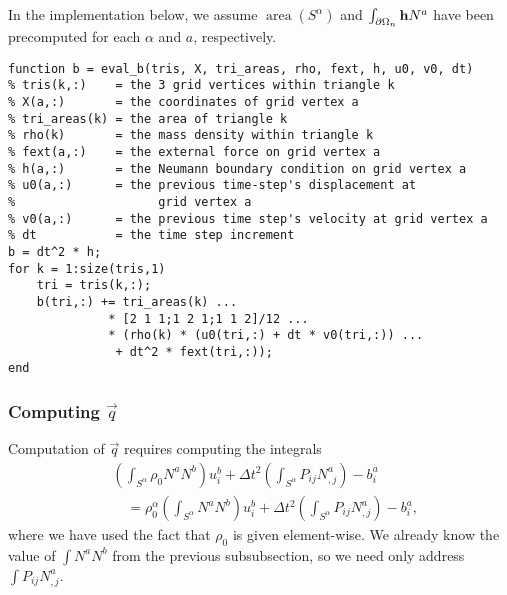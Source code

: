 In the implementation below, we assume $\operatorname{area} \left( S^{\alpha} \right)$ and $\int_{\partial \Omega_n} \mathbf{h} N^a$ have been precomputed for each $\alpha$ and $a$, respectively.
\begin{verbatim}
function b = eval_b(tris, X, tri_areas, rho, fext, h, u0, v0, dt)
% tris(k,:)    = the 3 grid vertices within triangle k
% X(a,:)       = the coordinates of grid vertex a
% tri_areas(k) = the area of triangle k
% rho(k)       = the mass density within triangle k
% fext(a,:)    = the external force on grid vertex a
% h(a,:)       = the Neumann boundary condition on grid vertex a
% u0(a,:)      = the previous time-step's displacement at
%                    grid vertex a
% v0(a,:)      = the previous time step's velocity at grid vertex a
% dt           = the time step increment
b = dt^2 * h;
for k = 1:size(tris,1)
    tri = tris(k,:);
    b(tri,:) += tri_areas(k) ...
              * [2 1 1;1 2 1;1 1 2]/12 ...
              * (rho(k) * (u0(tri,:) + dt * v0(tri,:)) ...
               + dt^2 * fext(tri,:));
end
\end{verbatim}

\vspace{.5\baselineskip}
\subsubsection{Computing $\vec{q}$}

Computation of $\vec{q}$ requires computing the integrals
\begin{equation*}
\begin{split}
& \left( \int_{S^{\alpha}} \rho_0 N^a N^b \right) u_i^b + \Delta t^2 \left( \int_{S^{\alpha}} P_{ij} N^a_{,j} \right) - b^a_i \\
& \quad = \rho_0^{\alpha} \left( \int_{S^{\alpha}} N^a N^b \right) u_i^b + \Delta t^2 \left( \int_{S^{\alpha}} P_{ij} N^a_{,j} \right) - b^a_i,
\end{split}
\end{equation*}
where we have used the fact that $\rho_0$ is given element-wise. We already know the value of $\int N^a N^b$ from the previous subsubsection, so we need only address $\int P_{ij} N^a_{,j}$.


